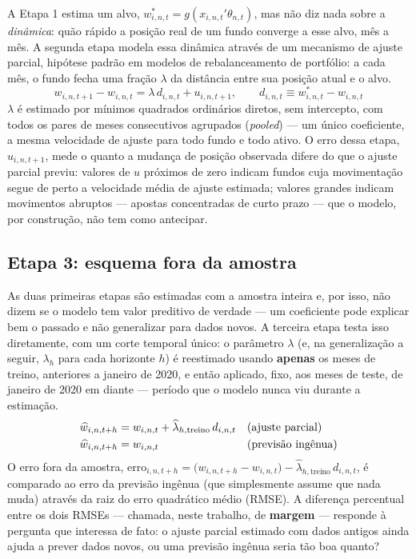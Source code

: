 \documentclass[11pt,a4paper]{article}
\begin{document}
A Etapa 1 estima um alvo, $w^*_{i,n,t} = g(x_{i,n,t}'\theta_{n,t})$, mas não diz nada sobre a
\emph{dinâmica}: quão rápido a posição real de um fundo converge a esse alvo, mês a mês. A
segunda etapa modela essa dinâmica através de um mecanismo de ajuste parcial, hipótese padrão em
modelos de rebalanceamento de portfólio: a cada mês, o fundo fecha uma fração $\lambda$ da
distância entre sua posição atual e o alvo.
\begin{equation}
w_{i,n,t+1} - w_{i,n,t} = \lambda\, d_{i,n,t} + u_{i,n,t+1}, \qquad
d_{i,n,t} \equiv w^*_{i,n,t} - w_{i,n,t}
\label{eq:pa}
\end{equation}
$\lambda$ é estimado por mínimos quadrados ordinários diretos, sem intercepto, com todos os
pares de meses consecutivos agrupados (\emph{pooled}) --- um único coeficiente, a mesma
velocidade de ajuste para todo fundo e todo ativo. O erro dessa etapa, $u_{i,n,t+1}$, mede o
quanto a mudança de posição observada difere do que o ajuste parcial previu: valores de $u$
próximos de zero indicam fundos cuja movimentação segue de perto a velocidade média de ajuste
estimada; valores grandes indicam movimentos abruptos --- apostas concentradas de curto prazo
--- que o modelo, por construção, não tem como antecipar.

\FloatBarrier
\subsection{Etapa 3: esquema fora da amostra}

As duas primeiras etapas são estimadas com a amostra inteira e, por isso, não dizem se o modelo
tem valor preditivo de verdade --- um coeficiente pode explicar bem o passado e não generalizar
para dados novos. A terceira etapa testa isso diretamente, com um corte temporal único: o
parâmetro $\lambda$ (e, na generalização a seguir, $\lambda_h$ para cada horizonte $h$) é
reestimado usando \textbf{apenas} os meses de treino, anteriores a janeiro de 2020, e então
aplicado, fixo, aos meses de teste, de janeiro de 2020 em diante --- período que o modelo nunca
viu durante a estimação.
\begin{align}
\widehat w_{i,n,t+h} &= w_{i,n,t} + \widehat\lambda_{h,\text{treino}}\, d_{i,n,t}
&&\text{(ajuste parcial)} \notag\\
\widehat w_{i,n,t+h} &= w_{i,n,t} &&\text{(previsão ingênua)}
\label{eq:oos}
\end{align}
O erro fora da amostra, $\text{erro}_{i,n,t+h} = \big(w_{i,n,t+h}-w_{i,n,t}\big) -
\widehat\lambda_{h,\text{treino}}\, d_{i,n,t}$, é comparado ao erro da previsão ingênua (que
simplesmente assume que nada muda) através da raiz do erro quadrático médio (RMSE). A diferença
percentual entre os dois RMSEs --- chamada, neste trabalho, de \textbf{margem} --- responde à
pergunta que interessa de fato: o ajuste parcial estimado com dados antigos ainda ajuda a prever
dados novos, ou uma previsão ingênua seria tão boa quanto?
\end{document}
